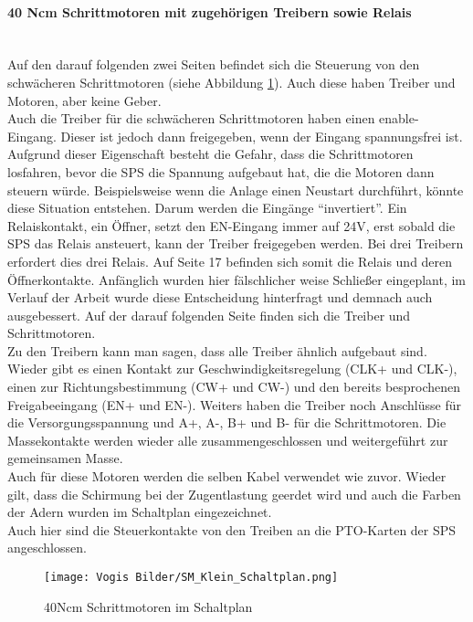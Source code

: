     \paragraph{40 Ncm Schrittmotoren mit zugehörigen Treibern sowie Relais}\mbox{}\\
    Auf den darauf folgenden zwei Seiten befindet sich die Steuerung von den schwächeren Schrittmotoren (siehe Abbildung \ref{fig:SMkleine}). Auch diese haben Treiber und Motoren, aber keine Geber.\\
    Auch die Treiber für die schwächeren Schrittmotoren haben einen enable-Eingang. Dieser ist jedoch dann freigegeben, wenn der Eingang spannungsfrei ist. Aufgrund dieser Eigenschaft besteht die Gefahr, dass die Schrittmotoren losfahren, bevor die SPS die Spannung aufgebaut hat, die die Motoren dann steuern würde. Beispielsweise wenn die Anlage einen Neustart durchführt, könnte diese Situation entstehen. Darum werden die Eingänge \enquote{invertiert}. Ein Relaiskontakt, ein Öffner, setzt den EN-Eingang immer auf 24V, erst sobald die SPS das Relais ansteuert, kann der Treiber freigegeben werden. Bei drei Treibern erfordert dies drei Relais. Auf Seite 17 befinden sich somit die Relais und deren Öffnerkontakte. Anfänglich wurden hier fälschlicher weise Schließer eingeplant, im Verlauf der Arbeit wurde diese Entscheidung hinterfragt und demnach auch ausgebessert. Auf der darauf folgenden Seite finden sich die Treiber und Schrittmotoren.\\
    Zu den Treibern kann man sagen, dass alle Treiber ähnlich aufgebaut sind. Wieder gibt es einen Kontakt zur Geschwindigkeitsregelung (CLK+ und CLK-), einen zur Richtungsbestimmung (CW+ und CW-) und den bereits besprochenen Freigabeeingang (EN+ und EN-). Weiters haben die Treiber noch Anschlüsse für die Versorgungsspannung und A+, A-, B+ und B- für die Schrittmotoren. Die Massekontakte werden wieder alle zusammengeschlossen und weitergeführt zur gemeinsamen Masse.\\ 
    Auch für diese Motoren werden die selben Kabel verwendet wie zuvor. Wieder gilt, dass die Schirmung bei der Zugentlastung geerdet wird und auch die Farben der Adern wurden im Schaltplan eingezeichnet.\\
    Auch hier sind die Steuerkontakte von den Treiben an die PTO-Karten der SPS angeschlossen.
    \begin{figure}[H]
        \centering
        \texttt{[image: Vogis Bilder/SM\_Klein\_Schaltplan.png]}
        \caption{40Ncm Schrittmotoren im Schaltplan}
        \label{fig:SMkleine}
    \end{figure}
